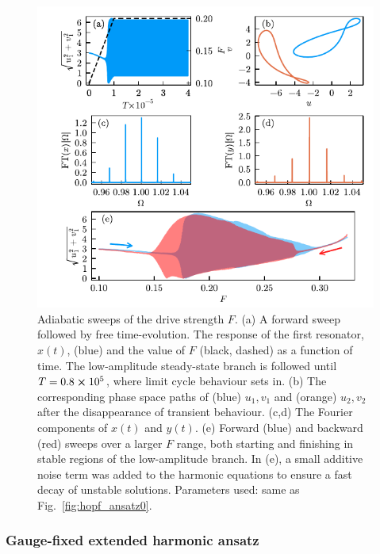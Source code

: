 \begin{figure} [h!]
	\centering
	\includegraphics{figures/limit_cycles/2_duffings_timedep.pdf}
	\caption{Adiabatic sweeps of the drive strength $F$. (a) A forward sweep followed by free time-evolution. The response of the first resonator, $x(t)$, (blue) and the value of $F$ (black, dashed) as a function of time. The low-amplitude steady-state branch is followed until $T = 0.8\cross10^{5}$, where limit cycle behaviour sets in. (b) The corresponding phase space paths of (blue) $u_1, v_1$ and (orange) $u_2, v_2$ after the disappearance of transient behaviour. (c,d) The Fourier components of $x(t)$ and $y(t)$. (e) Forward (blue) and backward (red) sweeps over a larger $F$ range, both starting and finishing in stable regions of the low-amplitude branch. In (e), a small additive noise term was added to the harmonic equations to ensure a fast decay of unstable solutions. Parameters used: same as Fig.~\ref{fig:hopf_ansatz0}.}
	\label{fig:hopf_timedep}
\end{figure}

 
\subsubsection{Gauge-fixed extended harmonic ansatz}

